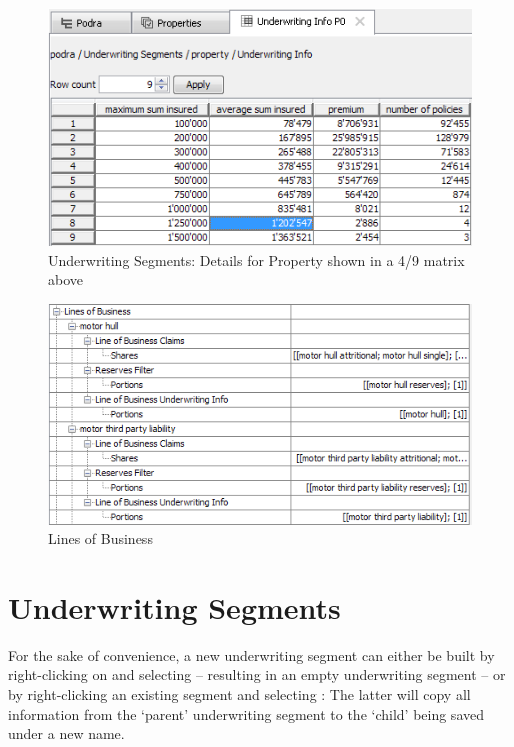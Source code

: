 \begin{figure}[htb]
	\centering
		\includegraphics[scale=0.6]{images/UnderwritingSegmentsProperty.png}
	\caption{Underwriting Segments: Details for Property shown in a 4/9 matrix above}
	\label{fig:UnderwritingSegmentsProperty}  
\end{figure}


\begin{figure}[htb]
	\centering
		\includegraphics[scale=0.6]{images/LOB.png}
	\caption{Lines of Business}
	\label{fig:LOB}
\end{figure}

\section{Underwriting Segments}
\label{sec:underwritingsegments}
For the sake of convenience, a new underwriting segment can either be built by right-clicking on  and selecting  -- resulting in an empty underwriting segment -- or by right-clicking an existing segment and selecting : The latter will copy all information from the `parent' underwriting segment to the `child' being saved under a new name.

